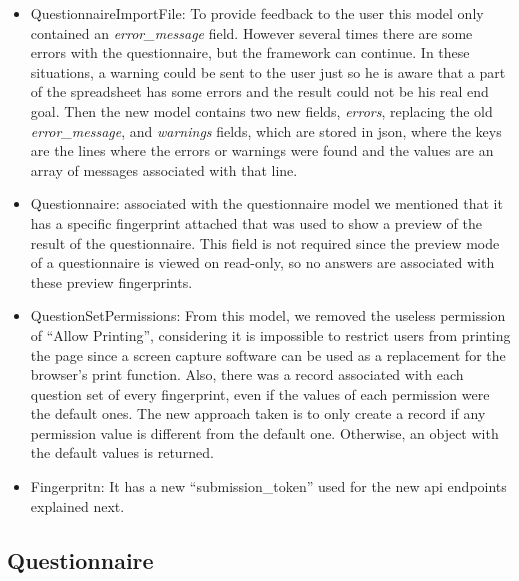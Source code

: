 \begin{itemize}
    \item QuestionnaireImportFile: To provide feedback to the user this model only contained an \textit{error\_message} field.
        However several times there are some errors with the questionnaire, but the framework can continue.
        In these situations, a warning could be sent to the user just so he is aware that a part of the spreadsheet has some errors and the result could not be his real end goal.
        Then the new model contains two new fields, \textit{errors}, replacing the old \textit{error\_message}, and \textit{warnings} fields, which are stored in \gls{json}, where the keys are the lines where the errors or warnings were found and the values are an array of messages associated with that line.
    \item Questionnaire: associated with the questionnaire model we mentioned that it has a specific fingerprint attached that was used to show a preview of the result of the questionnaire.
        This field is not required since the preview mode of a questionnaire is viewed on read-only, so no answers are associated with these preview fingerprints.
    \item QuestionSetPermissions: From this model, we removed the useless permission of ``Allow Printing'', considering it is impossible to restrict users from printing the page since a screen capture software can be used as a replacement for the browser's print function.
        Also, there was a record associated with each question set of every fingerprint, even if the values of each permission were the default ones.
        The new approach taken is to only create a record if any permission value is different from the default one.
        Otherwise, an object with the default values is returned.
    \item Fingerpritn: It has a new ``submission\_token'' used for the new \gls{api} endpoints explained next.
\end{itemize}

\subsection{Questionnaire}




